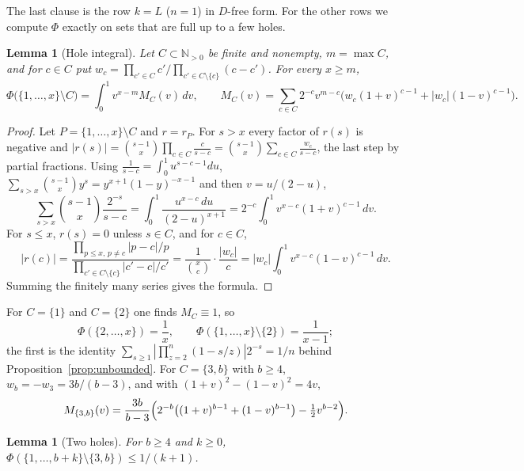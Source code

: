 \documentclass[11pt]{article}
\newtheorem{lemma}[theorem]{Lemma}
\newcommand{\N}{\mathbb N}
\begin{document}
The last clause is the row $k=L$ ($n=1$) in $D$-free form.  For the other
rows we compute $\Phi$ exactly on sets that are full up to a few holes.

\begin{lemma}[Hole integral]\label{lem:holeint}
Let $C\subset\N_{>0}$ be finite and nonempty, $m=\max C$, and for
$c\in C$ put $w_c=\prod_{c'\in C}c'\big/\prod_{c'\in C\setminus\{c\}}(c-c')$.
For every $x\ge m$,
\[
  \Phi\bigl(\{1,\ldots,x\}\setminus C\bigr)=\int_0^1v^{x-m}M_C(v)\,dv,
  \qquad
  M_C(v)=\sum_{c\in C}2^{-c}v^{m-c}\bigl(w_c(1+v)^{c-1}+|w_c|(1-v)^{c-1}\bigr).
\]
\end{lemma}

\begin{proof}
Let $P=\{1,\ldots,x\}\setminus C$ and $r=r_P$.  For $s>x$ every factor of
$r(s)$ is negative and
$|r(s)|=\binom{s-1}x\prod_{c\in C}\frac c{s-c}=\binom{s-1}x\sum_{c\in C}\frac{w_c}{s-c}$,
the last step by partial fractions.  Using $\frac1{s-c}=\int_0^1u^{s-c-1}du$,
$\sum_{s>x}\binom{s-1}x y^s=y^{x+1}(1-y)^{-x-1}$ and then $v=u/(2-u)$,
\[
  \sum_{s>x}\binom{s-1}x\frac{2^{-s}}{s-c}
  =\int_0^1\frac{u^{x-c}\,du}{(2-u)^{x+1}}
  =2^{-c}\int_0^1v^{x-c}(1+v)^{c-1}\,dv .
\]
For $s\le x$, $r(s)=0$ unless $s\in C$, and for $c\in C$,
\[
  |r(c)|=\frac{\prod_{p\le x,\,p\ne c}|p-c|/p}{\prod_{c'\in C\setminus\{c\}}|c'-c|/c'}
  =\frac1{\binom xc}\cdot\frac{|w_c|}c
  =|w_c|\int_0^1v^{x-c}(1-v)^{c-1}\,dv .
\]
Summing the finitely many series gives the formula.
\end{proof}

For $C=\{1\}$ and $C=\{2\}$ one finds $M_C\equiv1$, so
\begin{equation}\label{eq:onehole}
  \Phi(\{2,\ldots,x\})=\frac1x,\qquad
  \Phi(\{1,\ldots,x\}\setminus\{2\})=\frac1{x-1};
\end{equation}
the first is the identity
$\sum_{s\ge1}|\prod_{z=2}^n(1-s/z)|2^{-s}=1/n$ behind
Proposition~\ref{prop:unbounded}.  For $C=\{3,b\}$ with $b\ge4$,
$w_b=-w_3=3b/(b-3)$, and with $(1+v)^2-(1-v)^2=4v$,
\begin{equation}\label{eq:twohole}
  M_{\{3,b\}}(v)=\frac{3b}{b-3}\Bigl(2^{-b}\bigl((1+v)^{b-1}+(1-v)^{b-1}\bigr)
                   -\tfrac12v^{b-2}\Bigr).
\end{equation}

\begin{lemma}[Two holes]\label{lem:twohole}
For $b\ge4$ and $k\ge0$,
$\Phi(\{1,\ldots,b+k\}\setminus\{3,b\})\le1/(k+1)$.
\end{lemma}
\end{document}
